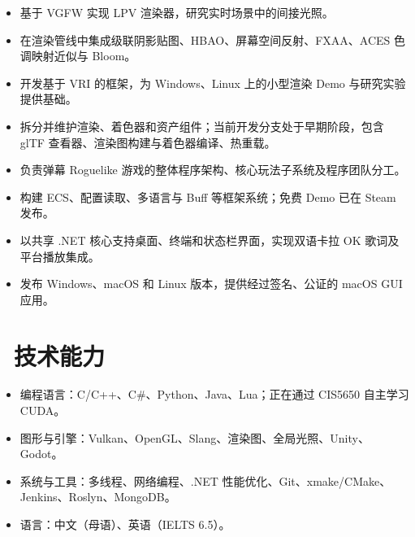 \documentclass{resume}
\begin{document}
\begin{itemize}
  \item 基于 VGFW 实现 LPV 渲染器，研究实时场景中的间接光照。
  \item 在渲染管线中集成级联阴影贴图、HBAO、屏幕空间反射、FXAA、ACES 色调映射近似与 Bloom。
\end{itemize}

\begin{itemize}
  \item 开发基于 VRI 的框架，为 Windows、Linux 上的小型渲染 Demo 与研究实验提供基础。
  \item 拆分并维护渲染、着色器和资产组件；当前开发分支处于早期阶段，包含 glTF 查看器、渲染图构建与着色器编译、热重载。
\end{itemize}

\begin{itemize}
  \item 负责弹幕 Roguelike 游戏的整体程序架构、核心玩法子系统及程序团队分工。
  \item 构建 ECS、配置读取、多语言与 Buff 等框架系统；免费 Demo 已在 Steam 发布。
\end{itemize}

\begin{itemize}
  \item 以共享 .NET 核心支持桌面、终端和状态栏界面，实现双语卡拉 OK 歌词及平台播放集成。
  \item 发布 Windows、macOS 和 Linux 版本，提供经过签名、公证的 macOS GUI 应用。
\end{itemize}

\section{\faCogs\ 技术能力}
\begin{itemize}
  \item 编程语言：C/C++、C\#、Python、Java、Lua；正在通过 CIS5650 自主学习 CUDA。
  \item 图形与引擎：Vulkan、OpenGL、Slang、渲染图、全局光照、Unity、Godot。
  \item 系统与工具：多线程、网络编程、.NET 性能优化、Git、xmake/CMake、Jenkins、Roslyn、MongoDB。
  \item 语言：中文（母语）、英语（IELTS 6.5）。
\end{itemize}
\end{document}
